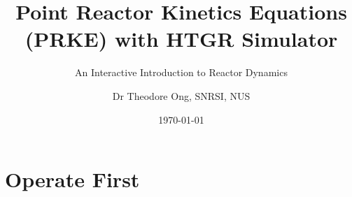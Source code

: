 \documentclass[aspectratio=169]{beamer}
\institute{Singapore Nuclear Research and Safety Institute}
\title[PRKE with HTGR Simulator]
      {Point Reactor Kinetics Equations (PRKE) with HTGR Simulator}
\subtitle{An Interactive Introduction to Reactor Dynamics}
\author{Dr Theodore Ong, SNRSI, NUS}
\date{\today}
\begin{document}

\begin{frame}
    \titlepage
\end{frame}



\section{Operate First}


\end{document}
